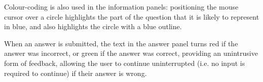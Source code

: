 \documentclass[12pt,twoside,notitlepage,xetex]{report}
\begin{document}
{Colour-coding is also used in the information panels: positioning the mouse cursor over a circle highlights the part of the question that it is likely to represent in blue, and also highlights the circle with a blue outline.

When an answer is submitted, the text in the answer panel turns red if the answer was incorrect, or green if the answer was correct, providing an unintrusive form of feedback, allowing the user to continue uninterrupted (i.e. no input is required to continue) if their answer is wrong.

\begin{center}
\begin{figure}[H]
\begin{center}
\hspace{2cm}
\\
\end{center}
\end{figure}
\end{center}}
\end{document}
